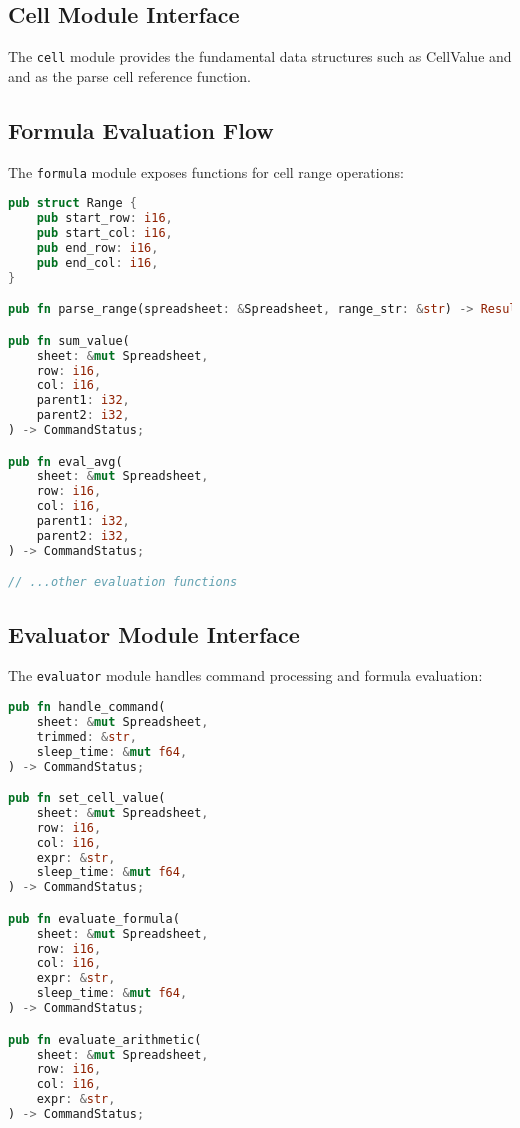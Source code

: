 \documentclass[11pt,a4paper]{article}
\begin{document}
\subsection{Cell Module Interface}

The \texttt{cell} module provides the fundamental data structures such as CellValue and and as the parse cell reference function.


\subsection{Formula Evaluation Flow}

The \texttt{formula} module exposes functions for cell range operations:

\begin{lstlisting}[language=Rust, caption={Formula module interface}, label=lst:formula-api]
pub struct Range {
    pub start_row: i16,
    pub start_col: i16,
    pub end_row: i16,
    pub end_col: i16,
}

pub fn parse_range(spreadsheet: &Spreadsheet, range_str: &str) -> Result;

pub fn sum_value(
    sheet: &mut Spreadsheet,
    row: i16,
    col: i16,
    parent1: i32,
    parent2: i32,
) -> CommandStatus;

pub fn eval_avg(
    sheet: &mut Spreadsheet,
    row: i16,
    col: i16,
    parent1: i32,
    parent2: i32,
) -> CommandStatus;

// ...other evaluation functions
\end{lstlisting}

\subsection{Evaluator Module Interface}

The \texttt{evaluator} module handles command processing and formula evaluation:

\begin{lstlisting}[language=Rust, caption={Evaluator module interface}, label=lst:evaluator-api]
pub fn handle_command(
    sheet: &mut Spreadsheet,
    trimmed: &str,
    sleep_time: &mut f64,
) -> CommandStatus;

pub fn set_cell_value(
    sheet: &mut Spreadsheet,
    row: i16,
    col: i16,
    expr: &str,
    sleep_time: &mut f64,
) -> CommandStatus;

pub fn evaluate_formula(
    sheet: &mut Spreadsheet,
    row: i16,
    col: i16,
    expr: &str,
    sleep_time: &mut f64,
) -> CommandStatus;

pub fn evaluate_arithmetic(
    sheet: &mut Spreadsheet,
    row: i16,
    col: i16,
    expr: &str,
) -> CommandStatus;
\end{lstlisting}
\end{document}

